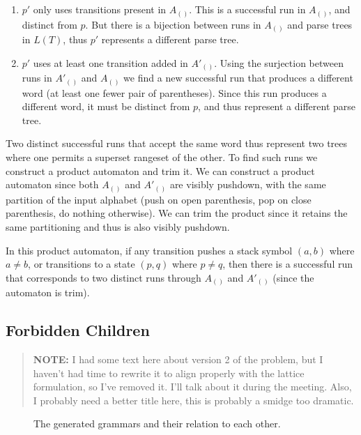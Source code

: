 \documentclass[acmsmall,review,anonymous]{acmart}\settopmatter{printfolios=true,printccs=false,printacmref=false}
\newcommand{\yield}{\mathit{yield}} %
\newcommand{\semantic}{\mathit{semantic}} %
\begin{document}
\begin{enumerate}
  \item $p'$ only uses transitions present in $A_{()}$. This is a successful run in $A_{()}$, and distinct from $p$. But there is a bijection between runs in $A_{()}$ and parse trees in $L(T)$, thus $p'$ represents a different parse tree.
  \item $p'$ uses at least one transition added in $A'_{()}$. Using the surjection between runs in $A'_{()}$ and $A_{()}$ we find a new successful run that produces a different word (at least one fewer pair of parentheses). Since this run produces a different word, it must be distinct from $p$, and thus represent a different parse tree.
\end{enumerate}

\noindent Two distinct successful runs that accept the same word thus represent two trees where one permits a superset rangeset of the other. To find such runs we construct a product automaton and trim it. We can construct a product automaton since both $A_{()}$ and $A'_{()}$ are visibly pushdown, with the same partition of the input alphabet (push on open parenthesis, pop on close parenthesis, do nothing otherwise). We can trim the product since it retains the same partitioning and thus is also visibly pushdown.

In this product automaton, if any transition pushes a stack symbol $(a, b)$ where $a \neq b$, or transitions to a state $(p, q)$ where $p \neq q$, then there is a successful run that corresponds to two distinct runs through $A_{()}$ and $A'_{()}$ (since the automaton is trim).

\subsection{Forbidden Children}

\begin{quote}
  \textbf{NOTE:} I had some text here about version 2 of the problem, but I haven't had time to rewrite it to align properly with the lattice formulation, so I've removed it. I'll talk about it during the meeting. Also, I probably need a better title here, this is probably a smidge too dramatic.
\end{quote}

\newpage

\begin{figure*}[ht]
  \caption{The generated grammars and their relation to each other.}
\end{figure*}
\end{document}
